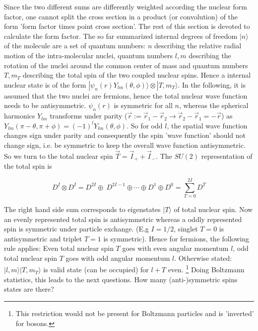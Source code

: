 \documentclass[11pt,a4paper]{article}
\begin{document}
Since the two different sums are differently weighted according the nuclear form factor, one cannot split the cross section
in a product (or convolution) of the form 'form factor times point cross section'. \newline
The rest of this section is devoted to calculate the form factor. The so far summarized internal degrees of freedom $|n \rangle$
of the molecule are a set of quantum numbers: $n$ describing the relative radial motion of the intra-molecular nuclei, 
quantum numbers $l, m$ describing the rotation of the nuclei around the common center of mass and quantum numbers $T, m_T$ describing
the total spin of the two coupled nuclear spins. Hence a internal nuclear state is of the form $|\psi_n(r) Y_{lm} (\theta, \phi) \rangle
\otimes | T, m_T \rangle$. In the following, it is assumed that the two nuclei are fermions, hence the total nuclear wave function
needs to be antisymmetric. $\psi_n(r)$ is symmetric for all $n$, whereas the spherical harmonics 
$Y_{lm}$ transforms under parity ($\vec r := \vec r_1 - \vec r_2 \rightarrow \vec r_2 - \vec r_1 = -\vec r$) as 
$Y_{lm}(\pi - \theta, \pi + \phi) = (-1)^l Y_{lm} (\theta, \phi)$. So for odd $l$, the spatial wave function changes sign under parity and
consequently the spin 'wave function' should not change sign, i.e. be symmetric to keep the overall wave function antisymmetric.
So we turn to the total nuclear spin $\vec T = \vec I_{+} + \vec I_{-}$. The $SU(2)$ representation of the total spin is

\begin{equation}
D^{I} \otimes D^{I} = D^{2I} \oplus \ D^{2I -1 } \oplus \cdots \oplus D^1 \oplus D^0 = \sum_{T = 0}^{2I} D^{T}
\end{equation}

The right hand side sum corresponds to eigenstates $|T \rangle$ of total nuclear spin. Now an evenly represented total spin
is antisymmetric whereas a oddly represented spin is symmetric under particle exchange. (E.g $I = 1/2$, singlet $T=0$ is antisymmetric
and triplet $T=1$ is symmetric). Hence for fermions, the following rule applies: Even total nuclear spin $T$ goes with even angular momentum $l$,
odd total nuclear spin $T$ goes with odd angular momentum $l$. Otherwise stated: $|l,m  \rangle | T, m_T \rangle$ is valid state (can be occupied) for $l + T$ even.
\footnote{This restriction would not be present for Boltzmann particles and is 'inverted' for bosons.}
Doing Boltzmann statistics, this leads to the next questions. How many (anti-)symmetric spins states are there?
\end{document}

